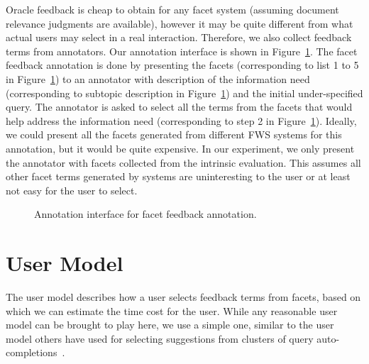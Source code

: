 Oracle feedback is cheap to obtain for any facet system (assuming document relevance judgments are available), however it may be quite different from what actual users may select in a real interaction. Therefore, we also collect feedback terms from annotators. Our annotation interface is shown in Figure~\ref{fig:feedback-annotation}. The facet feedback annotation is done by presenting the facets (corresponding to list 1 to 5 in Figure~\ref{fig:feedback-annotation}) to an annotator with description of the information need (corresponding to subtopic description in Figure~\ref{fig:feedback-annotation}) and the initial under-specified query. The annotator is asked to select all the terms from the facets that would help address the information need (corresponding to step 2 in Figure~\ref{fig:feedback-annotation}). Ideally, we could present all the facets generated from different FWS systems for this annotation, but it would be quite expensive. In our experiment, we only present the annotator with facets collected 
from the intrinsic evaluation. This assumes all other facet terms generated by systems are uninteresting to the user or at least not easy for the user to select.

\begin{figure}[H]
\centering
{}
\caption{Annotation interface for facet feedback annotation.}
\label{fig:feedback-annotation}
\end{figure}

\section{User Model} \label{sec:user-model}
The user model describes how a user selects feedback terms from facets, based on which we can estimate the time cost for the user. While any reasonable user model can be brought to play here, we use a simple one, similar to the user model others have used for selecting suggestions from clusters of query auto-completions~\cite{jain2010organizing}.

